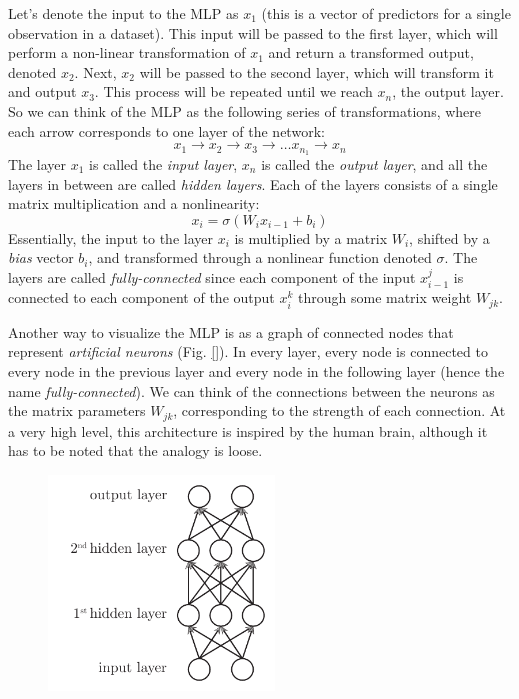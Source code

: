 \documentclass[12pt]{article}
\begin{document}
Let's denote the input to the MLP as $x_1$ (this is a vector of predictors for a single observation in a dataset). This input will be passed to the first layer, which will perform a non-linear transformation of $x_1$ and return a transformed output, denoted $x_2$. Next, $x_2$ will be passed to the second layer, which will transform it and output $x_3$. This process will be repeated until we reach $x_n$, the output layer. So we can think of the MLP as the following series of transformations, where each arrow corresponds to one layer of the network:
$$
x_1 \rightarrow x_2 \rightarrow x_3 \rightarrow \ldots x_{n_1} \rightarrow x_n
$$
The layer $x_1$ is called the \textit{input layer}, $x_n$ is called the \textit{output layer}, and all the layers in between are called \textit{hidden layers}. Each of the layers consists of a single matrix multiplication and a nonlinearity:
$$
x_i = \sigma(W_i x_{i-1} + b_i)
$$
Essentially, the input to the layer $x_i$ is multiplied by a matrix $W_i$, shifted by a \textit{bias} vector $b_i$, and transformed through a nonlinear function denoted $\sigma$. The layers are called \textit{fully-connected} since each component of the input $x_{i-1}^j$ is connected to each component of the output $x_i^k$ through some matrix weight $W_{jk}$.

Another way to visualize the MLP is as a graph of connected nodes that represent \textit{artificial neurons} (Fig. \ref{}). In every layer, every node is connected to every node in the previous layer and every node in the following layer (hence the name \textit{fully-connected}). We can think of the connections between the neurons as the matrix parameters $W_{jk}$, corresponding to the strength of each connection. At a very high level, this architecture is inspired by the human brain, although it has to be noted that the analogy is loose.

\begin{figure}[h]
\centering
\includegraphics[width=6cm]{illustrations/mlp.pdf}
\caption{}
\label{fig_mlp}
\end{figure}
\end{document}
